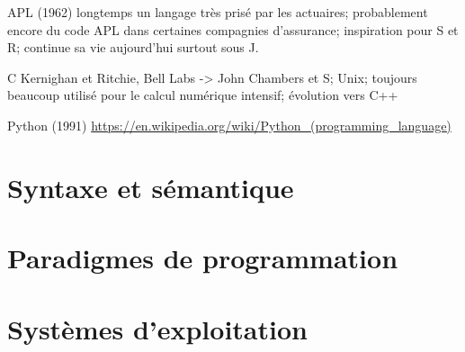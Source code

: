 APL (1962) longtemps un langage très prisé par les actuaires; probablement
encore du code APL dans certaines compagnies d'assurance; inspiration
pour S et R; continue sa vie aujourd'hui surtout sous J.



C Kernighan et Ritchie, Bell Labs -> John Chambers et S; Unix;
toujours beaucoup utilisé pour le calcul numérique intensif; évolution
vers C++

Python (1991)
\url{https://en.wikipedia.org/wiki/Python_(programming_language)}







\section{Syntaxe et sémantique}
\label{sec:informatique:syntaxe}

\section{Paradigmes de programmation}
\label{sec:informatique:paradigmes}

\section{Systèmes d'exploitation}
\label{sec:informatique:os}



